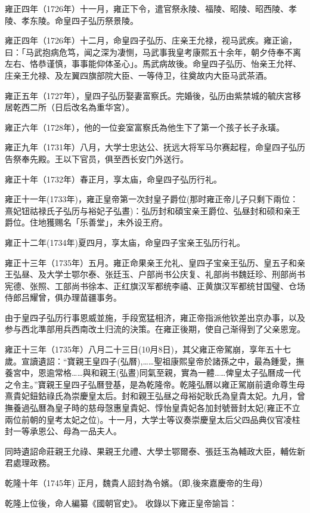 雍正四年（1726年）十一月，雍正下令，遣官祭永陵、福陵、昭陵、昭西陵、孝陵、孝东陵。命皇四子弘历祭景陵。

雍正四年（1726年）十二月，命皇四子弘历、庄亲王允禄，视马武疾。雍正谕，曰：「马武抱病危笃，闻之深为凄恻，马武事我皇考康熙五十余年，朝夕侍奉不离左右、恪恭谨慎，事事能仰体圣心」。馬武病故後。命皇四子弘历、怡亲王允祥、庄亲王允禄、及左翼四旗部院大臣、一等侍卫，往奠故内大臣马武茶酒。

雍正五年（1727年），皇四子弘历娶妻富察氏。完婚後，弘历由紫禁城的毓庆宮移居乾西二所（日后改名為重华宮）。

雍正六年（1728年），他的一位妾室富察氏為他生下了第一个孩子长子永璜。

雍正九年（1731年）八月，大学士忠达公、抚远大将军马尔赛起程，命皇四子弘历告祭奉先殿。王以下官员，俱至西长安门外送行。

雍正十年（1732年）春正月，享太庙，命皇四子弘历行礼。

雍正十一年(1733年)，雍正皇帝第一次封皇子爵位(那时雍正帝儿子只剩下兩位：熹妃钮祜禄氏子弘历与裕妃子弘晝)：弘历封和碩宝亲王爵位、弘昼封和硕和亲王爵位。住地獲赐名「乐善堂」，未外设王府。

雍正十二年(1734年)夏四月，享太庙，命皇四子宝亲王弘历行礼。

雍正十三年（1735年）五月。雍正命果亲王允礼、皇四子宝亲王弘历、皇五子和亲王弘昼、及大学士鄂尔泰、张廷玉、户部尚书公庆复、礼部尚书魏廷珍、刑部尚书宪德、张照、工部尚书徐本、正红旗汉军都统李禧、正黄旗汉军都统甘国璧、仓场侍郎吕耀曾，俱办理苗疆事务。

由于皇四子弘历行事恩威並施，手段宽猛相济，雍正帝指派他钦差出京办事，以及参与西北準部用兵西南改土归流的決策。在雍正後期，使自己渐得到了父亲恩宠。

雍正十三年（1735年）八月二十三日(10月8日)，其父雍正帝駕崩，享年五十七歲。宣讀遺詔：“寶親王皇四子(弘曆),……聖祖康熙皇帝於諸孫之中，最為鍾愛，撫養宮中，恩逾常格……與和親王(弘晝)同氣至親，實為一體……俾皇太子弘曆成一代之令主。”寶親王皇四子弘曆登基，是為乾隆帝。乾隆弘曆以雍正駕崩前遺命尊生母熹貴妃鈕鈷祿氏為崇慶皇太后。封和親王弘昼之母裕妃耿氏為皇貴太妃。九月，曾撫養過弘曆為皇子時的慈母愨惠皇貴妃、惇怡皇貴妃各加封號晉封太妃(雍正不立兩位前朝的皇考太妃之位)。十一月，大学士等议奏崇慶皇太后父四品典仪官凌柱封一等承恩公、母為一品夫人。

同時遺詔命莊親王允祿、果親王允禮、大學士鄂爾泰、張廷玉為輔政大臣，輔佐新君處理政務。

乾隆十年（1745年) 正月，魏貴人詔封為令嬪。（即,後來嘉慶帝的生母）

乾隆上位後，命人編纂《國朝官史》。 收錄以下雍正皇帝諭旨：


